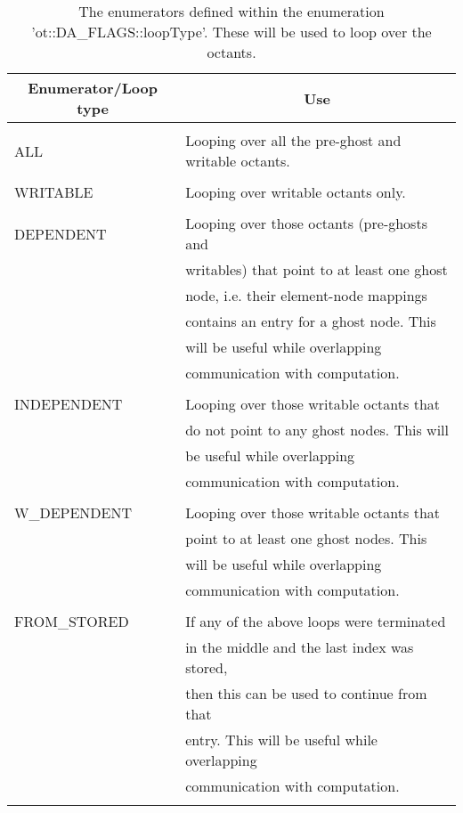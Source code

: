 \documentclass[12pt,reqno,a4paper]{report}
\numberwithin{equation}{section}
\begin{document}
\begin{table}
	\centering
		\begin{tabular}{|l|l|}\hline
		\multicolumn{1}{|c}{Enumerator/Loop type} & \multicolumn{1}{|c|}{Use}\\\hline
									 &\\
		  ALL    			 & Looping over all the pre-ghost and writable octants.\\
		  						 &\\
      WRITABLE     & Looping over writable octants only.\\
      					   &\\
      DEPENDENT    & Looping over those octants (pre-ghosts and\\
      						 & writables) that point to at least one ghost\\
      						 & node, i.e. their element-node mappings\\
      						 & contains an entry for a ghost node. This\\
      						 & will be useful while overlapping\\
      						 & communication with computation.\\
      						 &\\
      INDEPENDENT  & Looping over those writable octants that\\
      						 & do not point to any ghost nodes. This will\\
      						 & be useful while overlapping\\
      						 & communication with computation.\\
      						 &\\
      W\_DEPENDENT & Looping over those writable octants that\\
      						 & point to at least one ghost nodes. This\\
      						 & will be useful while overlapping\\
      						 & communication with computation.\\
      						 &\\
      FROM\_STORED & If any of the above loops were terminated\\
      						 & in the middle and the last index was stored,\\
      						 & then this can be used to continue from that\\
      						 & entry. This will be useful while overlapping\\
      						 & communication with computation.\\
      						 &\\\hline
		\end{tabular}
\caption{The enumerators defined within the enumeration 'ot::DA\_FLAGS::loopType'. These will be used to loop over the octants.}
\label{tab:loopTypes}
\end{table}
\end{document}

